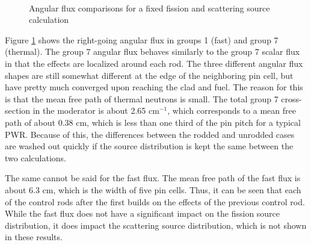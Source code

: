 \begin{figure}[h]
    \centering
    ~
    \caption{Angular flux comparisons for a fixed fission and scattering source calculation}\label{f:1dmoc-fixed-50-angflux}
\end{figure}

Figure \ref{f:1dmoc-fixed-50-angflux} shows the right-going angular flux in groups 1 (fast) and group 7 (thermal).  The group 7 angular flux behaves similarly to the group 7 scalar flux in that the effects are localized around each rod.  The three different angular flux shapes are still somewhat different at the edge of the neighboring pin cell, but have pretty much converged upon reaching the clad and fuel.  The reason for this is that the mean free path of thermal neutrons is small.  The total group 7 cross-section in the moderator is about 2.65 cm$^{-1}$, which corresponds to a mean free path of about 0.38 cm, which is less than one third of the pin pitch for a typical PWR.  Because of this, the differences between the rodded and unrodded cases are washed out quickly if the source distribution is kept the same between the two calculations.

The same cannot be said for the fast flux.  The mean free path of the fast flux is about 6.3 cm, which is the width of five pin cells.  Thus, it can be seen that each of the control rods after the first builds on the effects of the previous control rod.  While the fast flux does not have a significant impact on the fission source distribution, it does impact the scattering source distribution, which is not shown in these results.

